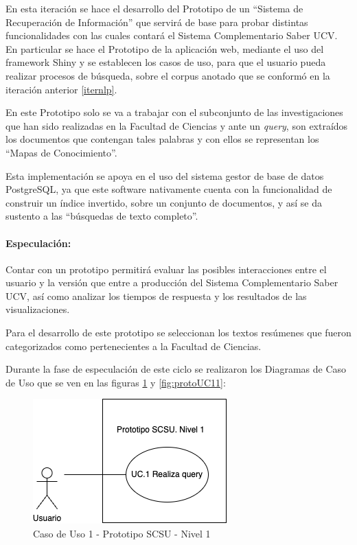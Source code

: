 \documentclass[
  12pt,
  openany]{book}
\begin{document}
En esta iteración se hace el desarrollo del Prototipo de un ``Sistema de Recuperación de Información'' que servirá de base para probar distintas funcionalidades con las cuales contará el Sistema Complementario Saber UCV. En particular se hace el Prototipo de la aplicación web, mediante el uso del framework Shiny \citep{shiny-2} y se establecen los casos de uso, para que el usuario pueda realizar procesos de búsqueda, sobre el corpus anotado que se conformó en la iteración anterior \ref{iternlp}.

En este Prototipo solo se va a trabajar con el subconjunto de las investigaciones que han sido realizadas en la Facultad de Ciencias y ante un \emph{query}, son extraídos los documentos que contengan tales palabras y con ellos se representan los ``Mapas de Conocimiento''.

Esta implementación se apoya en el uso del sistema gestor de base de datos PostgreSQL, ya que este software nativamente cuenta con la funcionalidad de construir un índice invertido, sobre un conjunto de documentos, y así se da sustento a las ``búsquedas de texto completo''.

\hypertarget{especulaciuxf3n-6}{%
\paragraph{Especulación:}\label{especulaciuxf3n-6}}

Contar con un prototipo permitirá evaluar las posibles interacciones entre el usuario y la versión que entre a producción del Sistema Complementario Saber UCV, así como analizar los tiempos de respuesta y los resultados de las visualizaciones.

Para el desarrollo de este prototipo se seleccionan los textos resúmenes que fueron categorizados como pertenecientes a la Facultad de Ciencias.

Durante la fase de especulación de este ciclo se realizaron los Diagramas de Caso de Uso que se ven en las figuras \ref{fig:protoUC1} y \ref{fig:protoUC11}:

\newpage

\begin{figure}

{\centering \includegraphics[width=0.45\linewidth]{images/05-desarrollo/2_ciclo/UC/prototipo_nivel1} 

}

\caption{Caso de Uso 1 - Prototipo SCSU - Nivel 1}\label{fig:protoUC1}
\end{figure}
\end{document}
